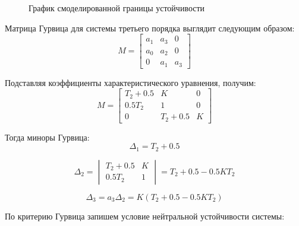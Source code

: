 \documentclass[a4paper, 11pt]{article}
\begin{document}
\begin{figure}[h!]
\centering
{}
\caption{График смоделированной границы устойчивости}
\end{figure}

\par 
Матрица Гурвица для системы третьего порядка выглядит следующим образом:
\begin{equation}
M=
\begin{bmatrix}
a_1 & a_3 & 0 \\
a_0 & a_2 & 0 \\
0 & a_1 & a_3 
\end{bmatrix}
\end{equation}

\par 
Подставляя коэффициенты характеристического уравнения, получим:
\begin{equation}
M=
\begin{bmatrix}
T_2+0.5 & K & 0 \\
0.5T_2 & 1 & 0 \\
0 & T_2+0.5 & K
\end{bmatrix}
\end{equation}

\par 
Тогда миноры Гурвица:
\begin{equation}
\Delta_1=T_2+0.5
\end{equation}

\begin{equation}
\Delta_2=
\begin{vmatrix}
T_2+0.5 & K \\
0.5T_2 & 1
\end{vmatrix} 
=T_2+0.5-0.5KT_2
\end{equation}

\begin{equation}
\Delta_3=a_3\Delta_2=K(T_2+0.5-0.5KT_2)
\end{equation}

\par 
По критерию Гурвица запишем условие нейтральной устойчивости системы:
\end{document}
